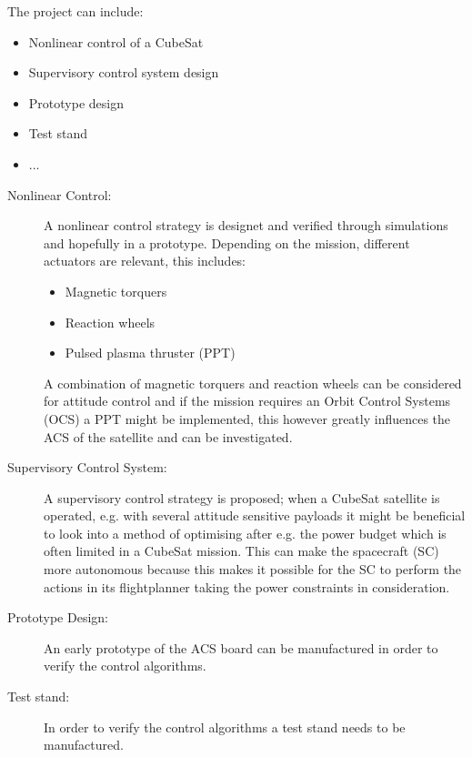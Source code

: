 The project can include:
\begin{itemize}\tightlist
  \item Nonlinear control of a CubeSat
  \item Supervisory control system design
  \item Prototype design
  \item Test stand
  \item ...
\end{itemize}

\begin{description}
  \item[Nonlinear Control:] A nonlinear control strategy is designet and verified through simulations and hopefully in a prototype. Depending on the mission, different actuators are relevant, this includes:
    \begin{itemize}\tightlist
      \item Magnetic torquers
      \item Reaction wheels
      \item Pulsed plasma thruster (PPT)
    \end{itemize}
    A combination of magnetic torquers and reaction wheels can be considered for attitude control and if the mission requires an Orbit Control Systems (OCS) a PPT might be implemented, this however greatly influences the ACS of the satellite and can be investigated.
  \item[Supervisory Control System:] A supervisory control strategy is proposed; when a CubeSat satellite is operated, e.g. with several attitude sensitive payloads it might be beneficial to look into a method of optimising after e.g. the power budget which is often limited in a CubeSat mission. This can make the spacecraft (SC) more autonomous because this makes it possible for the SC to perform the actions in its flightplanner taking the power constraints in consideration.
  \item[Prototype Design:] An early prototype of the ACS board can be manufactured in order to verify the control algorithms.
  \item[Test stand:] In order to verify the control algorithms a test stand needs to be manufactured.
\end{description}
